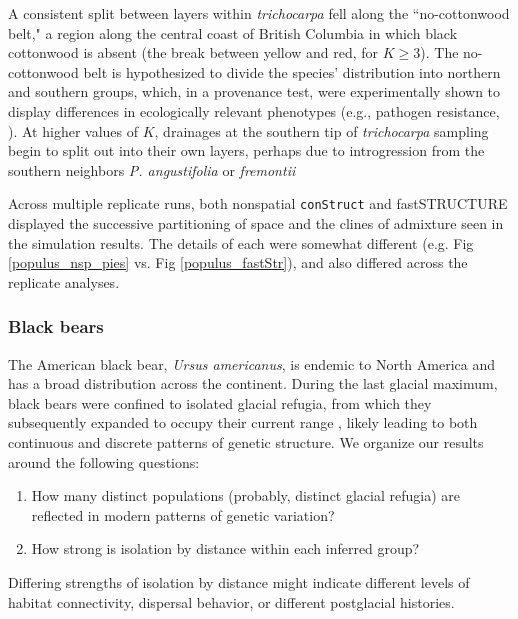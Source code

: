 \documentclass[10pt,letterpaper]{article}
\newcommand{\tri}{\textit{trichocarpa}}
\begin{document}
A consistent split between layers within \tri{} fell along the ``no-cottonwood belt," 
a region along the central coast of British Columbia in which black
cottonwood is absent (the break between yellow and red, for $K \geq 3$). 
The no-cottonwood belt is hypothesized to divide the species' distribution
into northern and southern groups, which, in a provenance test, 
were experimentally shown to display differences in ecologically relevant phenotypes 
(e.g., pathogen resistance, \cite{xie2009,xie2012}).  
At higher values of $K$, drainages at the southern tip of \tri{} sampling 
begin to split out into their own layers,
perhaps due to introgression from the southern neighbors
\textit{P. angustifolia} or \textit{fremontii} \cite{Zhou2012,geraldes_etal_2014}


Across multiple replicate runs, 
both nonspatial \texttt{conStruct} and fastSTRUCTURE displayed 
the successive partitioning of space and the clines of admixture seen in the simulation results.
The details of each were somewhat different 
(e.g. Fig \ref{populus_nsp_pies} vs. Fig \ref{populus_fastStr}), 
and also differed across the replicate analyses.



\subsubsection*{Black bears}

The American black bear, \textit{Ursus americanus}, is endemic to North America
and has a broad distribution across the continent.
During the last glacial maximum, 
black bears were confined to isolated glacial refugia, 
from which they subsequently expanded to occupy their current range
\cite{WoodingWard1997,Byun1997,Stone2000,Puckett2015},
likely leading to both continuous and discrete patterns of genetic structure.
We organize our results around the following questions:
\begin{enumerate}
    \item How many distinct populations (probably, distinct glacial refugia)
        are reflected in modern patterns of genetic variation?
    \item How strong is isolation by distance within each inferred group?
\end{enumerate}
Differing strengths of isolation by distance might indicate 
different levels of habitat connectivity,
dispersal behavior,
or different postglacial histories.
\end{document}
